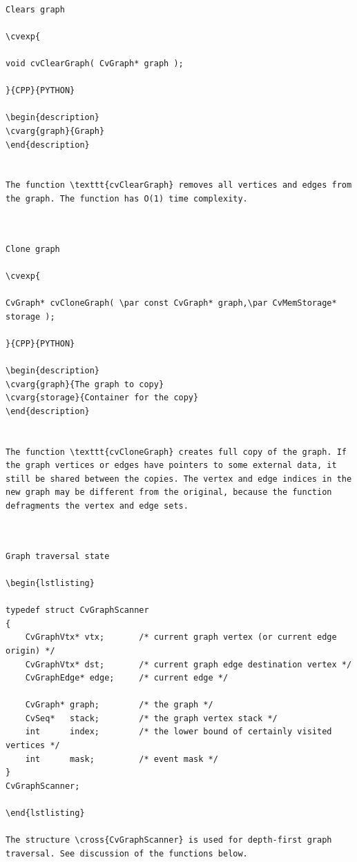 \label{ClearGraph}
\begin{verbatim}

Clears graph

\cvexp{

void cvClearGraph( CvGraph* graph );

}{CPP}{PYTHON}

\begin{description}
\cvarg{graph}{Graph}
\end{description}


The function \texttt{cvClearGraph} removes all vertices and edges from the graph. The function has O(1) time complexity.


\end{verbatim}
\label{CloneGraph}
\begin{verbatim}

Clone graph

\cvexp{

CvGraph* cvCloneGraph( \par const CvGraph* graph,\par CvMemStorage* storage );

}{CPP}{PYTHON}

\begin{description}
\cvarg{graph}{The graph to copy}
\cvarg{storage}{Container for the copy}
\end{description}


The function \texttt{cvCloneGraph} creates full copy of the graph. If the graph vertices or edges have pointers to some external data, it still be shared between the copies. The vertex and edge indices in the new graph may be different from the original, because the function defragments the vertex and edge sets.


\end{verbatim}
\label{CvGraphScanner}
\begin{verbatim}

Graph traversal state

\begin{lstlisting}

typedef struct CvGraphScanner
{
    CvGraphVtx* vtx;       /* current graph vertex (or current edge origin) */
    CvGraphVtx* dst;       /* current graph edge destination vertex */
    CvGraphEdge* edge;     /* current edge */

    CvGraph* graph;        /* the graph */
    CvSeq*   stack;        /* the graph vertex stack */
    int      index;        /* the lower bound of certainly visited vertices */
    int      mask;         /* event mask */
}
CvGraphScanner;

\end{lstlisting}

The structure \cross{CvGraphScanner} is used for depth-first graph traversal. See discussion of the functions below.


\end{verbatim}
